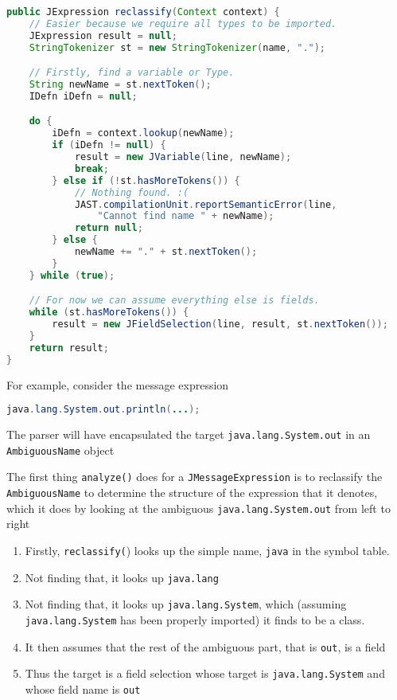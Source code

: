 \documentclass[8pt,a4paper,compress]{beamer}
\begin{document}
\begin{frame}[fragile]
\pause

\begin{lstlisting}[language=Java]
public JExpression reclassify(Context context) {
    // Easier because we require all types to be imported.
    JExpression result = null;
    StringTokenizer st = new StringTokenizer(name, ".");

    // Firstly, find a variable or Type.
    String newName = st.nextToken();
    IDefn iDefn = null;

    do {
        iDefn = context.lookup(newName);
        if (iDefn != null) {
            result = new JVariable(line, newName);
            break;
        } else if (!st.hasMoreTokens()) {
            // Nothing found. :(
            JAST.compilationUnit.reportSemanticError(line,
                "Cannot find name " + newName);
            return null;
        } else {
            newName += "." + st.nextToken();
        }
    } while (true);

    // For now we can assume everything else is fields.
    while (st.hasMoreTokens()) {
        result = new JFieldSelection(line, result, st.nextToken());
    }
    return result;
}
\end{lstlisting}
\end{frame}

\begin{frame}[fragile]
\pause

For example, consider the message expression
\begin{lstlisting}[language=Java]
java.lang.System.out.println(...);
\end{lstlisting}

The parser will have encapsulated the target \lstinline{java.lang.System.out} in an \lstinline{AmbiguousName} object

\pause
\bigskip

The first thing \lstinline{analyze()} does for a \lstinline{JMessageExpression} is to reclassify the \lstinline{AmbiguousName} to determine the structure of the expression that it denotes, which it does by looking at the ambiguous \lstinline{java.lang.System.out} from left to right
\begin{enumerate}
\item Firstly, \lstinline{reclassify(}) looks up the simple name, \lstinline{java} in the symbol table.
\item Not finding that, it looks up \lstinline{java.lang}
\item Not finding that, it looks up \lstinline{java.lang.System}, which (assuming \lstinline{java.lang.System} has been properly imported) it finds to be a class.
\item It then assumes that the rest of the ambiguous part, that is \lstinline{out}, is a field
\item Thus the target is a field selection whose target is \lstinline{java.lang.System} and whose field name is \lstinline{out}
\end{enumerate}
\end{frame}
\end{document}
